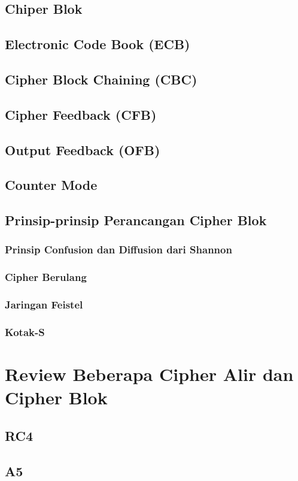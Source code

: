 \documentclass{book}
\begin{document}
    \section{Chiper Blok}
    \section{Electronic Code Book (ECB)}
    \section{Cipher Block Chaining (CBC)}
    \section{Cipher Feedback (CFB)}
    \section{Output Feedback (OFB)}
    \section{Counter Mode}
    \section{Prinsip-prinsip Perancangan Cipher Blok}
        \subsection{Prinsip Confusion dan Diffusion dari Shannon}
        \subsection{Cipher Berulang}
        \subsection{Jaringan Feistel}
        \subsection{Kotak-S}
\chapter{Review Beberapa Cipher Alir dan Cipher Blok}
     \section{RC4}
     \section{A5}
\end{document}
